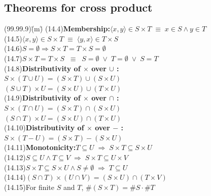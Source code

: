 \documentclass{amsart}
\newcommand{\lgap}{2pt}                             %
\newcommand{\equivs}{\ensuremath{\;\equiv\;}}       %
\newcommand{\equivss}{\ensuremath{\;\;\equiv\;\;}}  %
\newcommand{\impl}{\ensuremath{\Rightarrow}}        %
\newcommand{\impls}{\ensuremath{\;\Rightarrow\;}}   %
\begin{document}
\subsection*{Theorems for cross product}
\begin{tabbing}
(99.99.9)\;\=(m)\;\=\kill
(14.4)\>\textbf{Membership:}\quad $\langle x,y\rangle \in S\times T \equivs x\in S\land y\in T$\\[\lgap]
(14.5)\>$\langle x,y\rangle \in S\times T \equivs \langle y,x\rangle \in T\times S$\\[\lgap]
(14.6)\>$S=\emptyset \impl S\times T = T\times S = \emptyset$\\[\lgap]
(14.7)\>$S\times T = T\times S \equivss S = \emptyset \;\lor\; T = \emptyset \;\lor\; S = T$\\[\lgap]
(14.8)\>\textbf{Distributivity of $\times$ over $\cup$ :}\\[\lgap]
      \>$S\times (T\cup U) = (S\times T)\cup (S\times U)$\\[\lgap]
      \>$(S\cup T)\times U = (S\times U)\cup (T\times U)$\\[\lgap]
(14.9)\>\textbf{Distributivity of $\times$ over $\cap$ :}\\[\lgap]
      \>$S\times (T\cap U) = (S\times T)\cap (S\times U)$\\[\lgap]
      \>$(S\cap T)\times U = (S\times U)\cap (T\times U)$\\[\lgap]
(14.10)\>\textbf{Distributivity of $\times$ over $-$ :}\\[\lgap]
      \>$S\times (T - U) = (S\times T) - (S\times U)$\\[\lgap]
(14.11)\>\textbf{Monotonicity:}\quad $T\subseteq U\impls S\times T \subseteq S\times U$\\[\lgap]
(14.12)\>$S\subseteq U\land T\subseteq V\impls S\times T \subseteq U\times V$\\[\lgap]
(14.13)\>$S\times T\subseteq S\times U\land S\neq \emptyset\impls T\subseteq U$\\[\lgap]
(14.14)\>$(S\cap T)\times (U\cap V) = (S\times U)\cap (T\times V)$\\[\lgap]
(14.15)\>For finite $S$ and $T$, \quad $\# (S\times T) = \#S\cdot \# T$\\[\lgap]
\end{tabbing}
\end{document}
